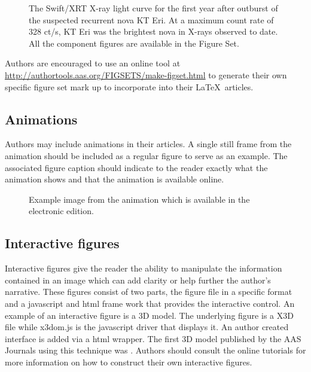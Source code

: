 \documentclass[preprint]{aastex62}
\newcommand\latex{La\TeX}
\begin{document}
\figsetgrpstart
{}
\figsetgrpend

\figsetend

\begin{figure}
\caption{The Swift/XRT X-ray light curve for the first year after
outburst of the suspected recurrent nova KT Eri. At a maximum count rate of 
328 ct/s, KT Eri was the brightest nova in X-rays observed to date. All 
the component figures are available in the Figure Set. \label{fig:fig4}}
\end{figure}

Authors are encouraged to use an online tool at
\url{http://authortools.aas.org/FIGSETS/make-figset.html} to generate their
own specific figure set mark up to incorporate into their \latex\ articles.

\subsection{Animations}

Authors may include animations in their articles.  A single still frame from 
the animation should be included as a regular figure to serve as an example.
The associated figure caption should indicate to the reader exactly what the
animation shows and that the animation is available online.

\begin{figure}
\caption{Example image from the animation which is available in the electronic
edition.}
\end{figure}

\subsection{Interactive figures}

Interactive figures give the reader the ability to manipulate the
information contained in an image which can add clarity or help further the
author's narrative.  These figures consist of two parts, the figure file in
a specific format and a javascript and html frame work that provides the
interactive control.  An example of an interactive figure is a 3D model.
The underlying figure is a X3D file while x3dom.js is the javascript driver
that displays it. An author created interface is added via a html wrapper.
The first 3D model published by the AAS Journals using this technique was
\citet{2014ApJ...793..127V}.  Authors should consult the online tutorials
for more information on how to construct their own interactive figures.
\end{document}
